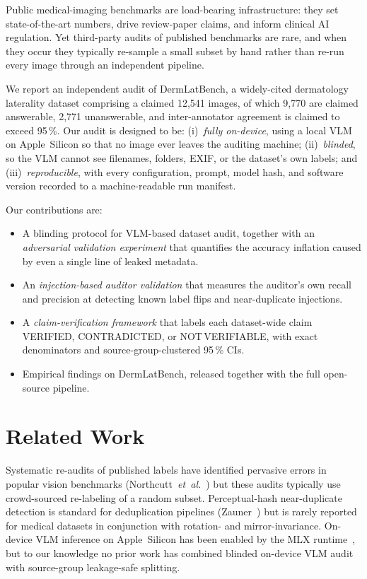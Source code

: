 \documentclass[conference]{IEEEtran}
\begin{document}
Public medical-imaging benchmarks are load-bearing infrastructure: they set
state-of-the-art numbers, drive review-paper claims, and inform clinical AI
regulation. Yet third-party audits of published benchmarks are rare, and when
they occur they typically re-sample a small subset by hand rather than re-run
every image through an independent pipeline.

We report an independent audit of DermLatBench, a widely-cited dermatology
laterality dataset comprising a claimed 12{,}541 images, of which 9{,}770 are
claimed answerable, 2{,}771 unanswerable, and inter-annotator agreement is
claimed to exceed 95\,\%. Our audit is designed to be:
(i)~\emph{fully on-device}, using a local VLM on Apple~Silicon so that no image
ever leaves the auditing machine;
(ii)~\emph{blinded}, so the VLM cannot see filenames, folders, EXIF, or the
dataset's own labels; and
(iii)~\emph{reproducible}, with every configuration, prompt, model hash, and
software version recorded to a machine-readable run manifest.

Our contributions are:
\begin{itemize}
  \item A blinding protocol for VLM-based dataset audit, together with an
    \emph{adversarial validation experiment} that quantifies the accuracy
    inflation caused by even a single line of leaked metadata.
  \item An \emph{injection-based auditor validation} that measures the
    auditor's own recall and precision at detecting known label flips and
    near-duplicate injections.
  \item A \emph{claim-verification framework} that labels each dataset-wide
    claim VERIFIED, CONTRADICTED, or NOT\,VERIFIABLE, with exact denominators
    and source-group-clustered 95\,\% CIs.
  \item Empirical findings on DermLatBench, released together with the full
    open-source pipeline.
\end{itemize}

\section{Related Work}

Systematic re-audits of published labels have identified pervasive errors in
popular vision benchmarks (Northcutt~\emph{et~al.}~\cite{northcutt2021}) but
these audits typically use crowd-sourced re-labeling of a random subset.
Perceptual-hash near-duplicate detection is standard for deduplication
pipelines (Zauner~\cite{zauner2010}) but is rarely reported for medical
datasets in conjunction with rotation- and mirror-invariance. On-device VLM
inference on Apple~Silicon has been enabled by the MLX
runtime~\cite{mlxframework}, but to our knowledge no prior work has combined
blinded on-device VLM audit with source-group leakage-safe splitting.
\end{document}
